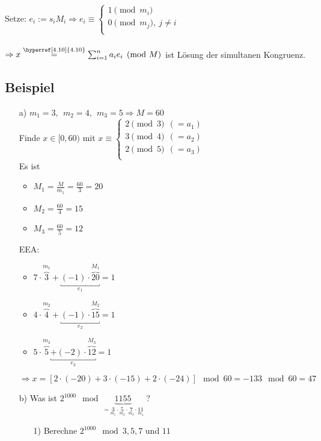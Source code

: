 \documentclass[12pt,titlepage, pdf]{article}
\renewcommand{\>}{\rightarrow}
\renewcommand{\*}{\cdot}
\begin{document}
	Setze: $e_i := s_i M_i \Rightarrow e_i \equiv \begin{cases*}
	1 \pmod{m_i} \\
	0 \pmod{m_j},~ j \neq i\\
	\end{cases*}$ \\
	\\
	$\Rightarrow x \overset{\textrm{\hyperref[4.10]{4.10}}}{=} \sum_{i = 1}^{n}a_i e_i \pmod{M} $ ist Lösung der simultanen Kongruenz.
	\subsection{Beispiel}
	\begin{itemize}
		\item[a)] $m_1 = 3, ~~m_2 = 4, ~~m_3 = 5 \Rightarrow M = 60$\\
		Finde $x \in [0,60)$ mit $x \equiv \begin{cases*}
		2 \pmod 3~~(=a_1)\\
		3 \pmod 4~~(=a_2)\\
		2 \pmod 5~~(=a_3)\\
		\end{cases*}$ \\
		Es ist 
		\begin{itemize}
			\item $M_1 = \frac{M}{m_1} = \frac{60}{3} = 20$ 
			\item  $M_2 = \frac{60}{4} = 15$
			\item $M_3 = \frac{60}{5} = 12$ 
		\end{itemize}
		EEA: 
		\begin{itemize}
			\item $7 \cdot \overbrace{3}^{m_1} + \underbracket{(-1) \cdot \overbrace{20}^{M_1}}_{e_1} = 1$
			\item $4 \cdot \overbrace{4}^{m_2} + \underbracket{(-1) \cdot \overbrace{15}^{M_2}}_{e_2} = 1$
			\item $5 \cdot \overbrace{5}^{m_3} \underbracket{+ (-2) \cdot \overbrace{12}^{M_3}}_{e_3} = 1$
		\end{itemize}
		$\Rightarrow x = [2 \cdot (-20) + 3 \cdot (-15) + 2 \cdot (-24)] \mod 60  =-133\mod 60= 47$
		\item[b)] Was ist $2^{1000} \mod \underbrace{1155}_{=\underset{m_1}{3} \cdot \underset{m_2}{5} \cdot \underset{m_3}{7} \cdot \underset{m_4}{11}}$ ?
		\begin{itemize}
			\item[1)] Berechne $2^{1000} \mod 3,5,7$ und $11$

\end{itemize}
\end{itemize}
\end{document}
